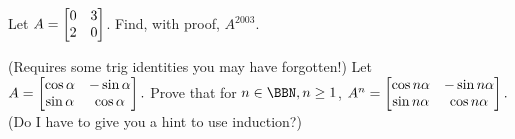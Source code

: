 \begin{pro}
Let $A = \begin{bmatrix} 0 & 3 \cr 2 & 0 \cr \end{bmatrix}$. Find,
with proof, $A^{2003}$.
\end{pro}

\begin{pro}
(Requires some trig identities you may have forgotten!)
 Let $A=
\begin{bmatrix} \cos \alpha & -\sin \alpha \cr \sin \alpha & \cos \alpha\end{bmatrix}.$
Prove that for $n \in \BBN , n \geq 1$,
$A^n = \begin{bmatrix} \cos n\alpha & -\sin n\alpha \cr \sin n\alpha & \cos n\alpha \cr \end{bmatrix}.$
(Do I have to give you a hint to use induction?)
\end{pro}

